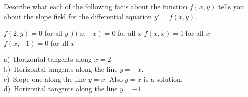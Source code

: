 \begin{exercise}
Describe what each of the following facts about the function $f(x,y)$ tells you about the slope field for the differential equation $y' = f(x,y)$.
\begin{tasks}
\task $f(2,y) = 0$ for all $y$
\task $f(x,-x) = 0$ for all $x$
\task $f(x,x) = 1$ for all $x$
\task $f(x, -1) = 0$ for all $x$
\end{tasks}
\end{exercise}
\comboSol{%
}
{%
a)~Horizontal tangents along $x=2$.\\
b)~Horizontal tangents along the line $y=-x$.\\
c)~Slope one along the line $y=x$. Also $y=x$ is a solution.\\
d)~Horizontal tangents along the line $y=-1$.
}

\setcounter{exercise}{100}

